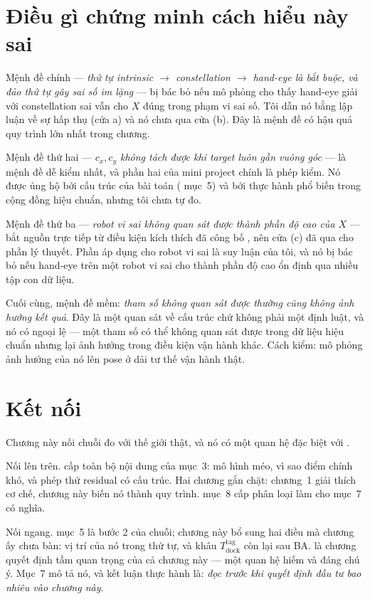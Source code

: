\documentclass[../../marker.tex]{subfiles}
\begin{document}
\section{Điều gì chứng minh cách hiểu này sai}

Mệnh đề chính --- \emph{thứ tự intrinsic \(\rightarrow\) constellation \(\rightarrow\) hand-eye là bắt buộc, và đảo thứ tự gây sai số im lặng} --- bị bác bỏ nếu mô phỏng cho thấy hand-eye giải với constellation sai vẫn cho \(X\) đúng trong phạm vi sai số. Tôi dẫn nó bằng lập luận về sự hấp thụ (cửa a) và nó chưa qua cửa (b). Đây là mệnh đề có hậu quả quy trình lớn nhất trong chương.

Mệnh đề thứ hai --- \emph{\(c_x, c_y\) không tách được khi target luôn gần vuông góc} --- là mệnh đề dễ kiểm nhất, và phần hai của mini project chính là phép kiểm. Nó được ủng hộ bởi cấu trúc của bài toán ( mục~5) và bởi thực hành phổ biến trong cộng đồng hiệu chuẩn, nhưng tôi chưa tự đo.

Mệnh đề thứ ba --- \emph{robot vi sai không quan sát được thành phần độ cao của \(X\)} --- bắt nguồn trực tiếp từ điều kiện kích thích đã công bố \cite{tsai1989handeye}, nên cửa (c) đã qua cho phần lý thuyết. Phần áp dụng cho robot vi sai là suy luận của tôi, và nó bị bác bỏ nếu hand-eye trên một robot vi sai cho thành phần độ cao ổn định qua nhiều tập con dữ liệu.

Cuối cùng, mệnh đề mềm: \emph{tham số không quan sát được thường cũng không ảnh hưởng kết quả}. Đây là một quan sát về cấu trúc chứ không phải một định luật, và nó có ngoại lệ --- một tham số có thể không quan sát được trong dữ liệu hiệu chuẩn nhưng lại ảnh hưởng trong điều kiện vận hành khác. Cách kiểm: mô phỏng ảnh hưởng của nó lên pose ở dải tư thế vận hành thật.

\section{Kết nối}

Chương này nối chuỗi đo với thế giới thật, và nó có một quan hệ đặc biệt với .

Nối lên trên.  cấp toàn bộ nội dung của mục~3: mô hình méo, vì sao điểm chính khó, và phép thử residual có cấu trúc. Hai chương gắn chặt: chương~1 giải thích cơ chế, chương này biến nó thành quy trình.  mục~8 cấp phân loại làm cho mục~7 có nghĩa.

Nối ngang.  mục~5 là bước 2 của chuỗi; chương này bổ sung hai điều mà chương ấy chưa bàn: vị trí của nó trong thứ tự, và khâu \(T^{\text{tag}}_{\text{dock}}\) còn lại sau BA.  là chương quyết định tầm quan trọng của cả chương này --- một quan hệ hiếm và đáng chú ý. Mục~7 mô tả nó, và kết luận thực hành là: \emph{đọc  trước khi quyết định đầu tư bao nhiêu vào chương này}.
\end{document}
